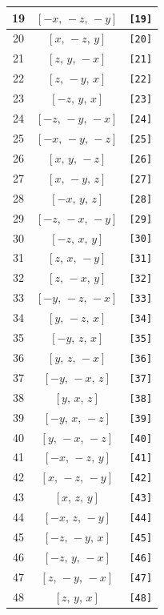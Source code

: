 \documentclass[fleqn,8pt]{jsarticle}
\begin{document}
\begin{longtable}{ccc}
19 & $\left[ - x,\, - z,\, - y \right]$ & {\tt [19]} \\ \hline
20 & $\left[ x,\, - z,\, y \right]$ & {\tt [20]} \\ \hline
21 & $\left[ z,\, y,\, - x \right]$ & {\tt [21]} \\ \hline
22 & $\left[ z,\, - y,\, x \right]$ & {\tt [22]} \\ \hline
23 & $\left[ - z,\, y,\, x \right]$ & {\tt [23]} \\ \hline
24 & $\left[ - z,\, - y,\, - x \right]$ & {\tt [24]} \\ \hline
25 & $\left[ - x,\, - y,\, - z \right]$ & {\tt [25]} \\ \hline
26 & $\left[ x,\, y,\, - z \right]$ & {\tt [26]} \\ \hline
27 & $\left[ x,\, - y,\, z \right]$ & {\tt [27]} \\ \hline
28 & $\left[ - x,\, y,\, z \right]$ & {\tt [28]} \\ \hline
29 & $\left[ - z,\, - x,\, - y \right]$ & {\tt [29]} \\ \hline
30 & $\left[ - z,\, x,\, y \right]$ & {\tt [30]} \\ \hline
31 & $\left[ z,\, x,\, - y \right]$ & {\tt [31]} \\ \hline
32 & $\left[ z,\, - x,\, y \right]$ & {\tt [32]} \\ \hline
33 & $\left[ - y,\, - z,\, - x \right]$ & {\tt [33]} \\ \hline
34 & $\left[ y,\, - z,\, x \right]$ & {\tt [34]} \\ \hline
35 & $\left[ - y,\, z,\, x \right]$ & {\tt [35]} \\ \hline
36 & $\left[ y,\, z,\, - x \right]$ & {\tt [36]} \\ \hline
37 & $\left[ - y,\, - x,\, z \right]$ & {\tt [37]} \\ \hline
38 & $\left[ y,\, x,\, z \right]$ & {\tt [38]} \\ \hline
39 & $\left[ - y,\, x,\, - z \right]$ & {\tt [39]} \\ \hline
40 & $\left[ y,\, - x,\, - z \right]$ & {\tt [40]} \\ \hline
41 & $\left[ - x,\, - z,\, y \right]$ & {\tt [41]} \\ \hline
42 & $\left[ x,\, - z,\, - y \right]$ & {\tt [42]} \\ \hline
43 & $\left[ x,\, z,\, y \right]$ & {\tt [43]} \\ \hline
44 & $\left[ - x,\, z,\, - y \right]$ & {\tt [44]} \\ \hline
45 & $\left[ - z,\, - y,\, x \right]$ & {\tt [45]} \\ \hline
46 & $\left[ - z,\, y,\, - x \right]$ & {\tt [46]} \\ \hline
47 & $\left[ z,\, - y,\, - x \right]$ & {\tt [47]} \\ \hline
48 & $\left[ z,\, y,\, x \right]$ & {\tt [48]} \\
\end{longtable}
\end{document}
